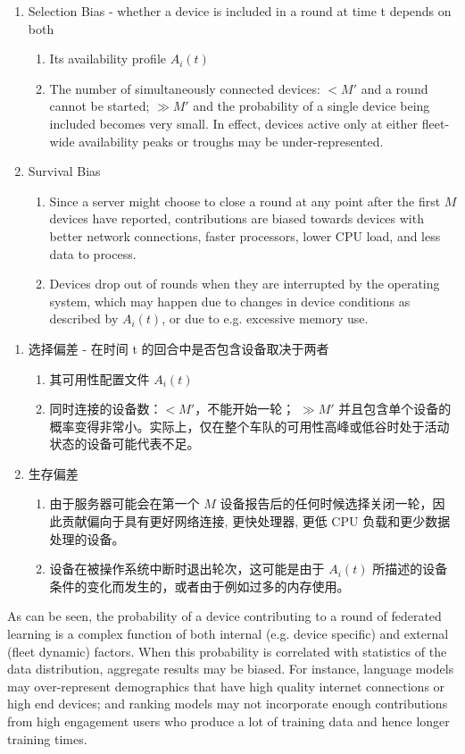 \begin{enumerate}
    \item Selection Bias - whether a device is included in a round at time t depends on both
    \begin{enumerate}
        \item Its availability profile $A_i(t)$
        \item The number of simultaneously connected devices: $<M'$ and a round cannot be started; $\gg M'$ and the probability of a single device being included becomes very small. In effect, devices active only at either fleet-wide availability peaks or troughs may be under-represented.
    \end{enumerate}
    \item Survival Bias
    \begin{enumerate}
        \item Since a server might choose to close a round at any point after the first $M$ devices have reported, contributions are biased towards devices with better network connections, faster processors, lower CPU load, and less data to process.
        \item Devices drop out of rounds when they are interrupted by the operating system, which may happen due to changes in device conditions as described by $A_i (t)$, or due to e.g. excessive memory use.
    \end{enumerate}
\end{enumerate}


\begin{enumerate}
    \item 选择偏差 - 在时间 t 的回合中是否包含设备取决于两者
    \begin{enumerate}
        \item 其可用性配置文件 $A_i(t)$
        \item 同时连接的设备数：$<M'$，不能开始一轮； $\gg M'$ 并且包含单个设备的概率变得非常小。实际上，仅在整个车队的可用性高峰或低谷时处于活动状态的设备可能代表不足。
    \end{enumerate}
    \item 生存偏差
    \begin{enumerate}
        \item 由于服务器可能会在第一个 $M$ 设备报告后的任何时候选择关闭一轮，因此贡献偏向于具有更好网络连接, 更快处理器, 更低 CPU 负载和更少数据处理的设备。
        \item 设备在被操作系统中断时退出轮次，这可能是由于 $A_i (t)$ 所描述的设备条件的变化而发生的，或者由于例如过多的内存使用。
    \end{enumerate}
\end{enumerate}
As can be seen, the probability of a device contributing to a round of federated learning is a complex function of both internal (e.g. device specific) and external (fleet dynamic) factors. When this probability is correlated with statistics of the data distribution, aggregate results may be biased. For instance, language models may over-represent demographics that have high quality internet connections or high end devices; and ranking models may not incorporate enough contributions from high engagement users who produce a lot of training data and hence longer training times.


